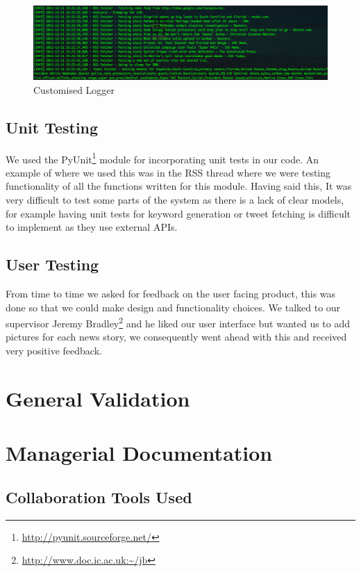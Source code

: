 \documentclass[a4paper,12pt]{article}
\begin{document}
	  \begin{figure}[ht!]
				  \centering
					  \includegraphics[scale=0.4]{logger.png}
				    \caption{Customised Logger}
	  \end{figure}
	
	  \subsection{Unit Testing}
	
	  We used the PyUnit\footnote{\url{http://pyunit.sourceforge.net/}} module for incorporating unit tests in our code. An example of where we used this was in the RSS thread where we were testing functionality of all the functions written for this module.
	  Having said this, It was very difficult to test some parts of the system as there is a lack of clear models, for example having unit tests for keyword generation or tweet fetching is difficult to implement as they use external APIs.
	
	\subsection{User Testing}
	  From time to time we asked for feedback on the user facing product, this was done so that we could make design and functionality choices. We talked to our supervisor Jeremy Bradley\footnote{\url{http://www.doc.ic.ac.uk:~/jb}} and he liked our user interface but wanted us to add pictures for each news story, we consequently went ahead with this and received very positive feedback.
	
	\section{General Validation}
	
	\section{Managerial Documentation}
	
		\subsection{Collaboration Tools Used}
		
\end{document}
